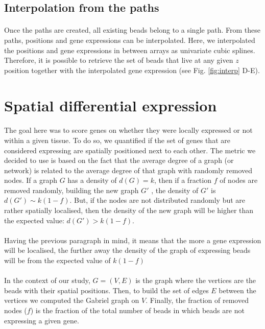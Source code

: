 \documentclass[10pt,a4paper]{article}
\begin{document}
\subsection{Interpolation from the paths}
\paragraph{}Once the paths are created, all existing beads belong to a single path.
From these paths, positions and gene expressions can be interpolated.
Here, we interpolated the positions and gene expressions in between arrays as univariate cubic splines. Therefore, it is possible to retrieve the set of beads that live at any given \(z\) position together with the interpolated gene expression (see Fig. \ref{fig:interp} D-E).
\section{Spatial differential expression}
\paragraph{}The goal here was to score genes on whether they were locally expressed or not within a given tissue.
To do so, we quantified if the set of genes that are considered expressing are spatially positioned next to each other.
The metric we decided to use is based on the fact that the average degree of a graph (or network) is related to the average degree of that graph with randomly removed nodes.
If a graph \(G\) has a density of \(d(G)=k\), then if a fraction \(f\) of nodes are removed randomly, building the new graph \(G'\) , the density of \(G'\)  is \(d(G')\sim k(1-f)\).
But, if the nodes are not distributed randomly but are rather spatially localised, then the density of the new graph will be higher than the expected value: \(d(G')>k(1-f)\).

\paragraph{}Having the previous paragraph in mind, it means that the more a gene expression will be localised, the further away the density of the graph of expressing beads will be from the expected value of $k(1-f)$
\paragraph{}In the context of our study, \(G = (V, E)\) is the graph where the vertices are the beads with their spatial positions.
Then, to build the set of edges \(E\) between the vertices we computed the Gabriel graph on \(V\).
Finally, the fraction of removed nodes (\(f\)) is the fraction of the total number of beads in which beads are not expressing a given gene.
\end{document}
